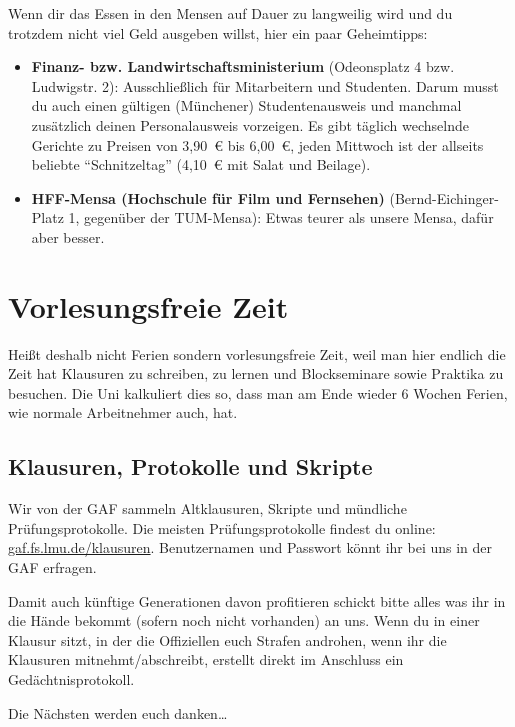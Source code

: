 \documentclass[twoside,12pt,parskip=half-]{scrartcl}
\begin{document}
Wenn dir das Essen in den Mensen auf Dauer zu langweilig wird und du trotzdem nicht viel Geld ausgeben willst, hier ein paar Geheimtipps:

\begin{itemize}
	\item \textbf{Finanz- bzw. Landwirtschaftsministerium} (Odeonsplatz 4 bzw. Ludwigstr. 2): Ausschließlich für Mitarbeitern und Studenten. Darum musst du auch einen gültigen (Münchener) Studentenausweis und manchmal zusätzlich deinen Personalausweis vorzeigen. Es gibt täglich wechselnde Gerichte zu Preisen von 3,90~€ bis 6,00~€, jeden Mittwoch ist der allseits beliebte “Schnitzeltag” (4,10~€ mit Salat und Beilage).

	\item \textbf{HFF-Mensa (Hochschule für Film und Fernsehen)}
          (Bernd-Eichinger-Platz 1, gegenüber der TUM-Mensa): Etwas
          teurer als unsere Mensa, dafür aber besser.
\end{itemize}


\clearpage

\section{Vorlesungsfreie Zeit}

Heißt deshalb nicht Ferien sondern vorlesungsfreie Zeit, weil man hier endlich die Zeit hat Klausuren zu schreiben, zu lernen und Blockseminare sowie Praktika zu besuchen. Die Uni kalkuliert dies so, dass man am Ende wieder 6 Wochen Ferien, wie normale Arbeitnehmer auch, hat.

\subsection{Klausuren, Protokolle und Skripte}
Wir von der GAF sammeln Altklausuren, Skripte und mündliche Prüfungsprotokolle. Die meisten Prüfungsprotokolle findest du online: \url{gaf.fs.lmu.de/klausuren}. Benutzernamen und Passwort könnt ihr bei uns in der GAF erfragen.

Damit auch künftige Generationen davon profitieren schickt bitte alles
was ihr in die Hände bekommt (sofern noch nicht vorhanden) an uns.
Wenn du in einer Klausur sitzt, in der die Offiziellen euch Strafen
androhen, wenn ihr die Klausuren mitnehmt/abschreibt, erstellt
direkt im Anschluss ein Gedächtnisprotokoll.

Die Nächsten werden euch danken\ldots

\clearpage
\end{document}
